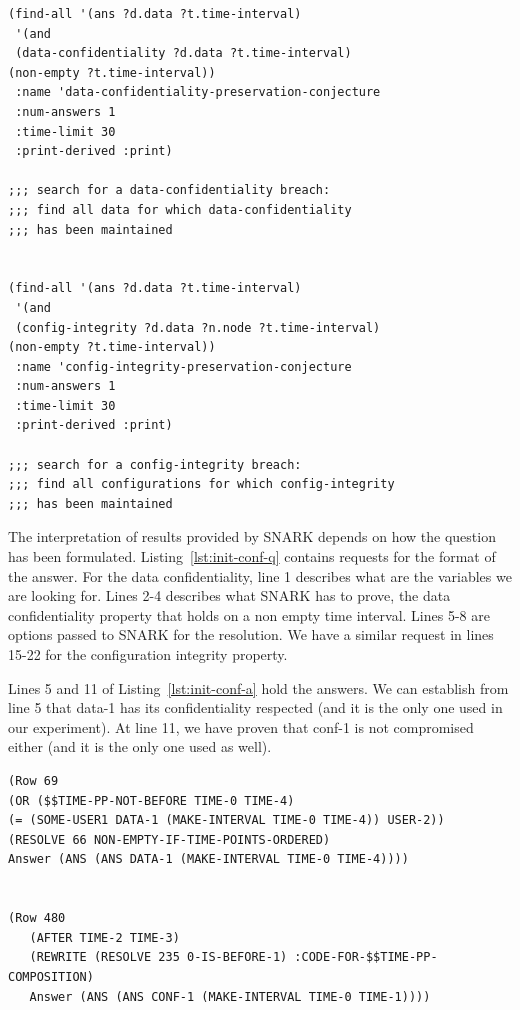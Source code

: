 \begin{lstlisting}[caption=SNARK question to validate the initial situation., label=lst:init-conf-q,captionpos=b] 
(find-all '(ans ?d.data ?t.time-interval)
 '(and
 (data-confidentiality ?d.data ?t.time-interval)
(non-empty ?t.time-interval))
 :name 'data-confidentiality-preservation-conjecture
 :num-answers 1
 :time-limit 30  
 :print-derived :print)

;;; search for a data-confidentiality breach:
;;; find all data for which data-confidentiality
;;; has been maintained


(find-all '(ans ?d.data ?t.time-interval)
 '(and
 (config-integrity ?d.data ?n.node ?t.time-interval)
(non-empty ?t.time-interval))
 :name 'config-integrity-preservation-conjecture
 :num-answers 1
 :time-limit 30  
 :print-derived :print)

;;; search for a config-integrity breach:
;;; find all configurations for which config-integrity
;;; has been maintained
\end{lstlisting}

The interpretation of results provided by SNARK depends on how the question has been formulated.
Listing~\ref{lst:init-conf-q} contains requests for the format of the answer.
For the data confidentiality, line 1 describes what are the variables we are looking for. Lines 2-4 describes what SNARK has to prove, \ie the data confidentiality property that holds on a non empty time interval.
Lines 5-8 are options passed to SNARK for the resolution.
We have a similar request in lines 15-22 for the configuration integrity property.

Lines 5 and 11 of Listing~\ref{lst:init-conf-a} hold the answers.
We can establish from line 5 that data-1 has its confidentiality respected (and it is the only one used in our experiment).
At line 11, we have proven that conf-1 is not compromised either (and it is the only one used as well).

\begin{lstlisting}[caption=SNARK validating the initial situation, label=lst:init-conf-a,captionpos=b] 
(Row 69
(OR ($$TIME-PP-NOT-BEFORE TIME-0 TIME-4) 
(= (SOME-USER1 DATA-1 (MAKE-INTERVAL TIME-0 TIME-4)) USER-2))
(RESOLVE 66 NON-EMPTY-IF-TIME-POINTS-ORDERED)
Answer (ANS (ANS DATA-1 (MAKE-INTERVAL TIME-0 TIME-4)))) 


(Row 480
   (AFTER TIME-2 TIME-3)
   (REWRITE (RESOLVE 235 0-IS-BEFORE-1) :CODE-FOR-$$TIME-PP-COMPOSITION)
   Answer (ANS (ANS CONF-1 (MAKE-INTERVAL TIME-0 TIME-1)))) 
\end{lstlisting}


